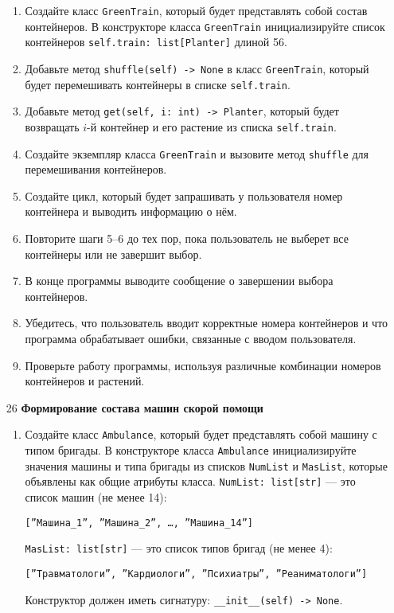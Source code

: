 \begin{enumerate}
\begin{enumerate}
    \item Создайте класс \texttt{GreenTrain}, который будет представлять собой состав контейнеров. В конструкторе класса \texttt{GreenTrain} инициализируйте список контейнеров \texttt{self.train: list[Planter]} длиной 56.

    \item Добавьте метод \texttt{shuffle(self) -> None} в класс \texttt{GreenTrain}, который будет перемешивать контейнеры в списке \texttt{self.train}.

    \item Добавьте метод \texttt{get(self, i: int) -> Planter}, который будет возвращать $i$-й контейнер и его растение из списка \texttt{self.train}.

    \item Создайте экземпляр класса \texttt{GreenTrain} и вызовите метод \texttt{shuffle} для перемешивания контейнеров.

    \item Создайте цикл, который будет запрашивать у пользователя номер контейнера и выводить информацию о нём.

    \item Повторите шаги 5–6 до тех пор, пока пользователь не выберет все контейнеры или не завершит выбор.

    \item В конце программы выводите сообщение о завершении выбора контейнеров.

    \item Убедитесь, что пользователь вводит корректные номера контейнеров и что программа обрабатывает ошибки, связанные с вводом пользователя.

    \item Проверьте работу программы, используя различные комбинации номеров контейнеров и растений.
\end{enumerate}

\item[26] \textbf{Формирование состава машин скорой помощи}
\begin{enumerate}
    \item Создайте класс \texttt{Ambulance}, который будет представлять собой машину с типом бригады. В конструкторе класса \texttt{Ambulance} инициализируйте значения машины и типа бригады из списков \texttt{NumList} и \texttt{MasList}, которые объявлены как общие атрибуты класса. \texttt{NumList: list[str]} — это список машин (не менее 14): 
    \begin{center}
        \texttt{[''Машина\_1'', ''Машина\_2'', \dots, ''Машина\_14'']}
    \end{center}
    \texttt{MasList: list[str]} — это список типов бригад (не менее 4):
    \begin{center}
        \texttt{[''Травматологи'', ''Кардиологи'', ''Психиатры'', ''Реаниматологи'']}
    \end{center}
    Конструктор должен иметь сигнатуру: \texttt{\_\_init\_\_(self) -> None}.


\end{enumerate}
\end{enumerate}
